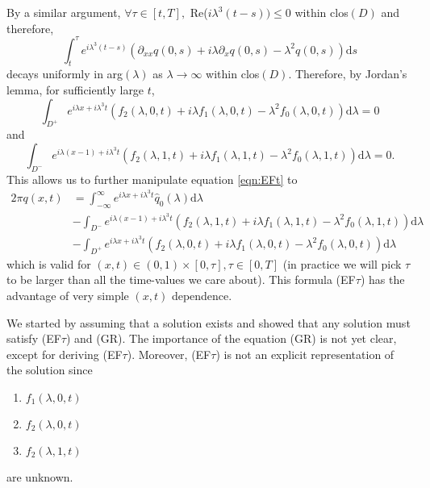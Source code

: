 By a similar argument, $\forall \tau \in [t,T],$ Re($i\lambda^3(t-s)) \leq 0$ within clos$(D)$ and therefore,
$$\int_t^\tau e^{i\lambda^3 (t-s)}\left(\partial_{xx}q(0,s) + i\lambda \partial_{x}q(0,s) - \lambda^2 q(0,s)\right) \mathrm{d}s$$
decays uniformly in arg$(\lambda)$ as $\lambda \rightarrow \infty$ within clos$(D)$.
Therefore, by Jordan's lemma, for sufficiently large $t$,
$$
    \int_{D^+} e^{i\lambda x+i\lambda^3 t}\left(f_2(\lambda,0,t) + i\lambda f_1(\lambda,0,t) - \lambda^2 f_0(\lambda,0,t)\right) \mathrm{d}\lambda = 0
$$
and
$$
    \int_{D^-} e^{i\lambda (x-1)+i\lambda^3 t}\left(f_2(\lambda,1,t) + i\lambda f_1(\lambda,1,t) - \lambda^2 f_0(\lambda,1,t)\right) \mathrm{d}\lambda = 0.
$$
This allows us to further manipulate equation \ref{eqn:EFt} to
\begin{align}
2\pi q(x,t) &= \int_{-\infty}^{\infty} e^{i\lambda x + i\lambda^3 t} \widehat{q}_0(\lambda) \mathrm{d}\lambda \label{eqn:EFtfinal}\\ 
&- \int_{D^-} e^{i\lambda (x-1)+i\lambda^3 t}\left(f_2(\lambda,1,t) + i\lambda f_1(\lambda,1,t) - \lambda^2 f_0(\lambda,1,t)\right) \mathrm{d}\lambda \nonumber \\
&- \int_{D^+} e^{i\lambda x+i\lambda^3 t}\left(f_2(\lambda,0,t) + i\lambda f_1(\lambda,0,t) - \lambda^2 f_0(\lambda,0,t)\right) \mathrm{d}\lambda \nonumber
\end{align}
which is valid for $(x,t) \in (0,1) \times [0,\tau], \tau \in [0,T]$ (in practice we will pick $\tau$ to be larger than all the time-values we care about).
This formula (EF$\tau$) has the advantage of very simple $(x,t)$ dependence.

We started by assuming that a solution exists and showed that any solution must satisfy (EF$\tau$) and (GR). 
The importance of the equation (GR) is not yet clear, except for deriving (EF$\tau$). 
Moreover, (EF$\tau$) is not an explicit representation of the solution since
\begin{enumerate}
    \item $f_1(\lambda,0,t)$
    \item $f_2(\lambda,0,t)$
    \item $f_2(\lambda,1,t)$
\end{enumerate}
are unknown.